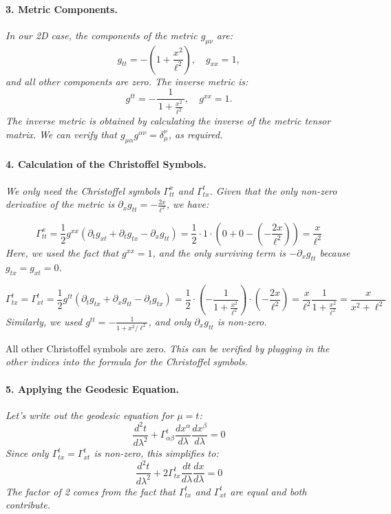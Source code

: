 \paragraph{3. Metric Components.}

\textit{In our 2D case, the components of the metric \(g_{\mu\nu}\) are:}
\[
g_{tt} = -\left(1 + \frac{x^2}{\ell^2}\right),
\quad
g_{xx} = 1,
\]
\textit{and all other components are zero. The inverse metric is:}
\[
g^{tt}
= -\frac{1}{\,1 + \frac{x^2}{\ell^2}\,},
\quad
g^{xx}
= 1.
\]
\textit{The inverse metric is obtained by calculating the inverse of the metric tensor matrix.} \emph{We can verify that \(g_{\mu\alpha}g^{\alpha\nu} = \delta_\mu^\nu\), as required.}

\paragraph{4. Calculation of the Christoffel Symbols.}

\textit{We only need the Christoffel symbols \(\Gamma^x_{tt}\) and \(\Gamma^{t}_{tx}\). Given that the only non-zero derivative of the metric is \(\partial_x g_{tt} = -\frac{2x}{\ell^2}\), we have:}

\[
\Gamma^x_{tt} = \frac{1}{2}g^{xx}(\partial_t g_{xt} + \partial_t g_{tx} - \partial_x g_{tt}) = \frac{1}{2} \cdot 1 \cdot (0 + 0 - (-\frac{2x}{\ell^2})) = \frac{x}{\ell^2}
\]
\emph{Here, we used the fact that \(g^{xx} = 1\), and the only surviving term is \(-\partial_x g_{tt}\) because \(g_{tx} = g_{xt} = 0\).}

\[
\Gamma^t_{tx} = \Gamma^t_{xt} = \frac{1}{2}g^{tt}(\partial_t g_{tx} + \partial_x g_{tt} - \partial_t g_{tx}) = \frac{1}{2} \cdot \left(-\frac{1}{1 + \frac{x^2}{\ell^2}}\right) \cdot (-\frac{2x}{\ell^2}) = \frac{x}{\ell^2} \frac{1}{1 + \frac{x^2}{\ell^2}} = \frac{x}{x^2 + \ell^2}
\]
\emph{Similarly, we used \(g^{tt} = -\frac{1}{1 + x^2/\ell^2}\), and only \(\partial_x g_{tt}\) is non-zero.}

All other Christoffel symbols are zero. \emph{This can be verified by plugging in the other indices into the formula for the Christoffel symbols.}

\paragraph{5. Applying the Geodesic Equation.}

\textit{Let's write out the geodesic equation for \(\mu = t\):}
\[
\frac{d^2t}{d\lambda^2} + \Gamma^t_{\alpha\beta} \frac{dx^\alpha}{d\lambda} \frac{dx^\beta}{d\lambda} = 0
\]
\textit{Since only \(\Gamma^t_{tx} = \Gamma^t_{xt}\) is non-zero, this simplifies to:}
\[
\frac{d^2t}{d\lambda^2} + 2\Gamma^t_{tx} \frac{dt}{d\lambda} \frac{dx}{d\lambda} = 0
\]
\emph{The factor of 2 comes from the fact that \(\Gamma^t_{tx}\) and \(\Gamma^t_{xt}\) are equal and both contribute.}

